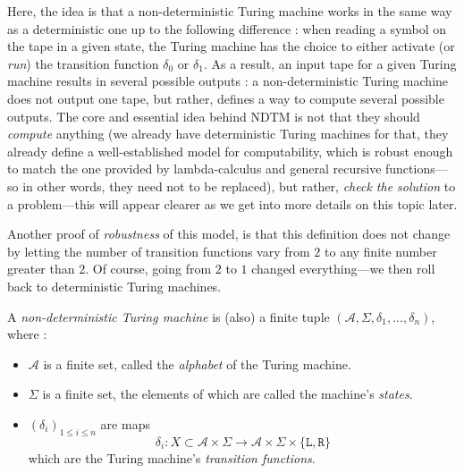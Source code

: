 Here, the idea is that a non-deterministic Turing machine works in the same way as a deterministic one up to the following difference : when reading a symbol on the tape in a given state, the Turing machine has the choice to either \og activate \fg (or \textit{run}) the transition function $ \delta_0 $ or $ \delta_1 $. As a result, an input tape for a given Turing machine results in several possible outputs : a non-deterministic Turing machine does not output one tape, but rather, defines a way to compute several possible outputs. The core and essential idea behind NDTM is not that they should \textit{compute} anything (we already have deterministic Turing machines for that, they already define a well-established model for computability, which is robust enough to match the one provided by lambda-calculus and general recursive functions---so in other words, they need not to be replaced), but rather, \textit{check the solution} to a problem---this will appear clearer as we get into more details on this topic later.

Another proof of \textit{robustness} of this model, is that this definition does not change by letting the number of transition functions vary from $ 2 $ to any finite number greater than $ 2 $. Of course, going from $ 2 $ to $ 1 $ changed everything---we then roll back to deterministic Turing machines.

\begin{definition}
    A \textit{non-deterministic Turing machine} is (also) a finite tuple \( (\mathcal A, \Sigma, \delta_1, ..., \delta_n ) \), where :
    \begin{itemize}
        \item $ \mathcal A $ is a finite set, called the \textit{alphabet} of the Turing machine.
        \item $ \Sigma $ is a finite set, the elements of which are called the machine's \textit{states}.
        \item $ (\delta_i)_{1 \leq i \leq n} $ are maps
        \[
        \delta_i : X \subset \mathcal A \times \Sigma \to \mathcal A \times \Sigma \times \{ \texttt{L}, \texttt{R}\}
        \]
        which are the Turing machine's \textit{transition functions}.
    \end{itemize}
\end{definition}

